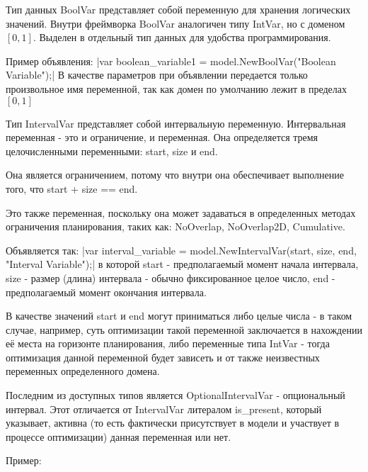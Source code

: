 Тип данных BoolVar представляет собой переменную для хранения логических значений. Внутри фреймворка BoolVar аналогичен типу IntVar, но с доменом $[0, 1]$. Выделен в отдельный тип данных для удобства программирования.

Пример объявления:
|var boolean_variable1 = model.NewBoolVar("Boolean Variable");|
В качестве параметров при объявлении передается только произвольное имя переменной, так как домен по умолчанию лежит в пределах $[0, 1]$

Тип IntervalVar представляет собой интервальную переменную. Интервальная переменная - это и ограничение, и переменная. Она определяется тремя целочисленными переменными: start, size и end.

Она является ограничением, потому что внутри она обеспечивает выполнение того, что start + size == end.

Это также переменная, поскольку она может задаваться в определенных методах ограничения планирования, таких как: NoOverlap, NoOverlap2D, Cumulative.

Объявляется так:
|var interval_variable = model.NewIntervalVar(start, size, end, "Interval Variable");|
в которой start - предполагаемый момент начала интервала, size - размер (длина) интервала - обычно фиксированное целое число, end - предполагаемый момент окончания интервала. 

В качестве значений start и end могут приниматься либо целые числа - в таком случае, например, суть оптимизации такой переменной заключается в нахождении её места на горизонте планирования, либо переменные типа IntVar - тогда оптимизация данной переменной будет зависеть и от также неизвестных переменных определенного домена.

Последним из доступных типов является OptionalIntervalVar - опциональный интервал. Этот отличается от IntervalVar литералом is\_present, который указывает, активна (то есть фактически присутствует в модели и участвует в процессе оптимизации) данная переменная или нет.

Пример:


